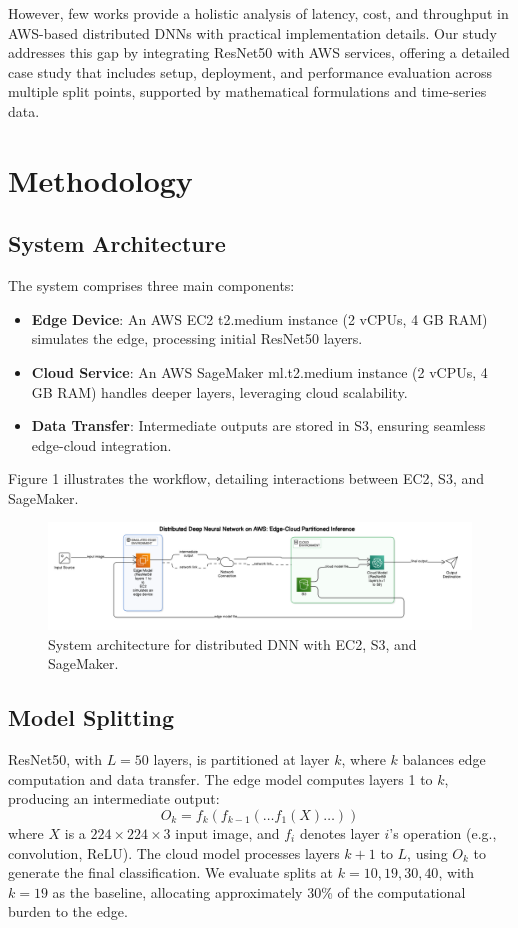 \documentclass[conference]{IEEEtran}
\begin{document}
However, few works provide a holistic analysis of latency, cost, and throughput in AWS-based distributed DNNs with practical implementation details. Our study addresses this gap by integrating ResNet50 with AWS services, offering a detailed case study that includes setup, deployment, and performance evaluation across multiple split points, supported by mathematical formulations and time-series data.

\section{Methodology}
\subsection{System Architecture}
The system comprises three main components:
\begin{itemize}
  \item \textbf{Edge Device}: An AWS EC2 t2.medium instance (2 vCPUs, 4 GB RAM) simulates the edge, processing initial ResNet50 layers.
  \item \textbf{Cloud Service}: An AWS SageMaker ml.t2.medium instance (2 vCPUs, 4 GB RAM) handles deeper layers, leveraging cloud scalability.
  \item \textbf{Data Transfer}: Intermediate outputs are stored in S3, ensuring seamless edge-cloud integration.
\end{itemize}

Figure 1 illustrates the workflow, detailing interactions between EC2, S3, and SageMaker.

\begin{figure}[h]
  \centering
  \includegraphics[width=0.8\columnwidth]{architecture.png}
  \caption{System architecture for distributed DNN with EC2, S3, and SageMaker.}
  \label{fig:architecture}
\end{figure}

\subsection{Model Splitting}
ResNet50, with \( L = 50 \) layers, is partitioned at layer \( k \), where \( k \) balances edge computation and data transfer. The edge model computes layers 1 to \( k \), producing an intermediate output:
\[
O_k = f_k(f_{k-1}(\dots f_1(X)\dots))
\]
where \( X \) is a \( 224 \times 224 \times 3 \) input image, and \( f_i \) denotes layer \( i \)'s operation (e.g., convolution, ReLU). The cloud model processes layers \( k + 1 \) to \( L \), using \( O_k \) to generate the final classification. We evaluate splits at \( k = 10, 19, 30, 40 \), with \( k = 19 \) as the baseline, allocating approximately 30\% of the computational burden to the edge.
\end{document}
